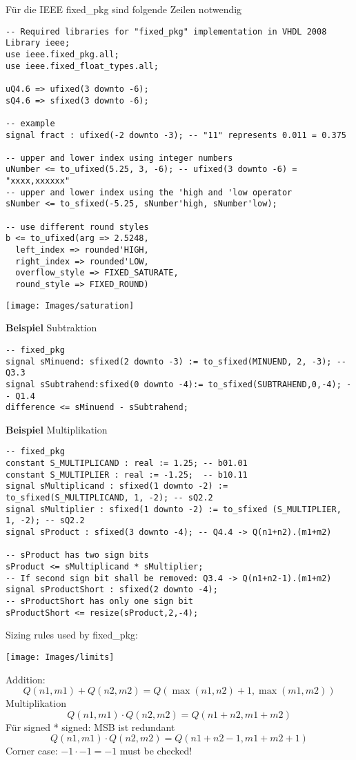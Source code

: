 Für die IEEE fixed\_pkg sind folgende Zeilen notwendig
\begin{lstlisting}
-- Required libraries for "fixed_pkg" implementation in VHDL 2008
Library ieee;
use ieee.fixed_pkg.all;
use ieee.fixed_float_types.all;

uQ4.6 => ufixed(3 downto -6);
sQ4.6 => sfixed(3 downto -6);

-- example
signal fract : ufixed(-2 downto -3); -- "11" represents 0.011 = 0.375

-- upper and lower index using integer numbers
uNumber <= to_ufixed(5.25, 3, -6); -- ufixed(3 downto -6) = "xxxx,xxxxxx"
-- upper and lower index using the 'high and 'low operator
sNumber <= to_sfixed(-5.25, sNumber'high, sNumber'low);

-- use different round styles
b <= to_ufixed(arg => 2.5248,
  left_index => rounded'HIGH,
  right_index => rounded'LOW,
  overflow_style => FIXED_SATURATE,
  round_style => FIXED_ROUND)
\end{lstlisting}
\vspace{-20pt}


\begin{center}
	\texttt{[image: Images/saturation]}
\end{center}

\textbf{Beispiel} Subtraktion
\begin{lstlisting}
-- fixed_pkg
signal sMinuend: sfixed(2 downto -3) := to_sfixed(MINUEND, 2, -3); -- Q3.3
signal sSubtrahend:sfixed(0 downto -4):= to_sfixed(SUBTRAHEND,0,-4); -- Q1.4
difference <= sMinuend - sSubtrahend;
\end{lstlisting}
\vspace{-20pt}


\textbf{Beispiel} Multiplikation
\begin{lstlisting}
-- fixed_pkg
constant S_MULTIPLICAND : real := 1.25; -- b01.01
constant S_MULTIPLIER : real := -1.25;  -- b10.11
signal sMultiplicand : sfixed(1 downto -2) := to_sfixed(S_MULTIPLICAND, 1, -2); -- sQ2.2
signal sMultiplier : sfixed(1 downto -2) := to_sfixed (S_MULTIPLIER, 1, -2); -- sQ2.2
signal sProduct : sfixed(3 downto -4); -- Q4.4 -> Q(n1+n2).(m1+m2)

-- sProduct has two sign bits
sProduct <= sMultiplicand * sMultiplier;
-- If second sign bit shall be removed: Q3.4 -> Q(n1+n2-1).(m1+m2)
signal sProductShort : sfixed(2 downto -4);
-- sProductShort has only one sign bit
sProductShort <= resize(sProduct,2,-4);
\end{lstlisting}


Sizing rules used by fixed\_pkg:
\begin{center}
	\texttt{[image: Images/limits]}
\end{center}

Addition:
\[
Q(n1,m1) + Q(n2,m2) = Q(\max(n1, n2) + 1, \max(m1, m2))
\]
Multiplikation
\[
Q(n1,m1) \cdot Q(n2,m2) = Q(n1 + n2, m1 + m2)
\]
Für signed * signed: MSB ist redundant
\[
Q(n1,m1) \cdot Q(n2,m2) = Q(n1 + n2 -1, m1 + m2+1)
\]
Corner case: $-1\cdot-1 = -1$ must be checked!